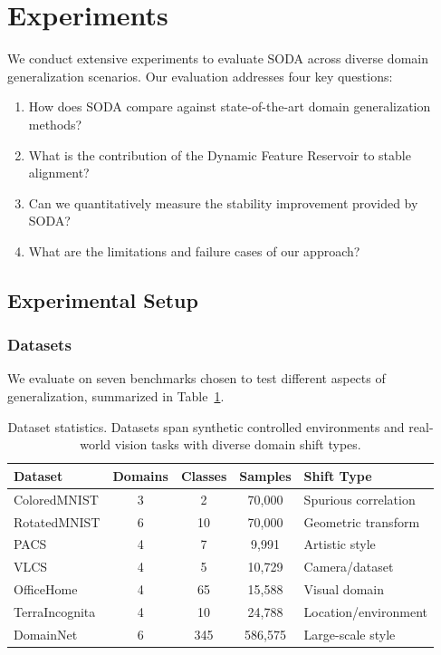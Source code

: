 \section{Experiments}
\label{sec:experiments}

We conduct extensive experiments to evaluate SODA across diverse domain generalization scenarios. Our evaluation addresses four key questions:
\begin{enumerate}
    \item How does SODA compare against state-of-the-art domain generalization methods?
    \item What is the contribution of the Dynamic Feature Reservoir to stable alignment?
    \item Can we quantitatively measure the stability improvement provided by SODA?
    \item What are the limitations and failure cases of our approach?
\end{enumerate}

\subsection{Experimental Setup}
\label{ssec:setup}

\subsubsection{Datasets}

We evaluate on seven benchmarks chosen to test different aspects of generalization, summarized in Table~\ref{tab:datasets}.

\begin{table}[t]
\caption{Dataset statistics. Datasets span synthetic controlled environments and real-world vision tasks with diverse domain shift types.}
\label{tab:datasets}
\centering
\small
\begin{tabular}{lcccl}
\toprule
\textbf{Dataset} & \textbf{Domains} & \textbf{Classes} & \textbf{Samples} & \textbf{Shift Type} \\
\midrule
ColoredMNIST & 3 & 2 & 70,000 & Spurious correlation \\
RotatedMNIST & 6 & 10 & 70,000 & Geometric transform \\
PACS & 4 & 7 & 9,991 & Artistic style \\
VLCS & 4 & 5 & 10,729 & Camera/dataset \\
OfficeHome & 4 & 65 & 15,588 & Visual domain \\
TerraIncognita & 4 & 10 & 24,788 & Location/environment \\
DomainNet & 6 & 345 & 586,575 & Large-scale style \\
\bottomrule
\end{tabular}
\end{table}

